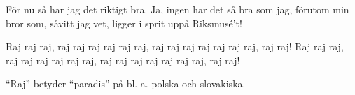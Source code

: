 \begin{song}

\begin{songmeta}
\end{songmeta}

\begin{songtext}
För nu så har jag det riktigt bra.
Ja, ingen har det så bra som jag,
förutom min bror som, såvitt jag vet,
ligger i sprit uppå Riksmusé't!

Raj raj raj,
raj raj raj raj raj raj,
raj raj raj raj raj raj raj, raj raj!
Raj raj raj,
raj raj raj raj raj raj,
raj raj raj raj raj raj raj, raj raj!
\end{songtext}

\begin{songnotes}
\textquotedblleft{}Raj\textquotedblright{} betyder \textquotedblleft{}paradis\textquotedblright{} på bl. a. polska och slovakiska.
\end{songnotes}

\end{song}
